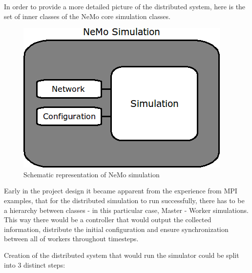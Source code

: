 In order to provide a more detailed picture of the distributed system, here is the set of inner classes of the NeMo core simulation classes.

\begin{figure}[h!]
\begin{center}
\includegraphics[scale = 0.6]{images/nemo_simulation_schematic.png}
\end{center}
\caption{Schematic representation of NeMo simulation}
\end{figure}

Early in the project design it became apparent from the experience from MPI examples\cite{}, that for the distributed simulation to run successfully, there has to be a hierarchy between classes - in this particular case, Master - Worker simulations. This way there would be a controller that would output the collected information, distribute the initial configuration and ensure synchronization between all of workers throughout timesteps.

Creation of the distributed system that would run the simulator could be split into 3 distinct steps:

